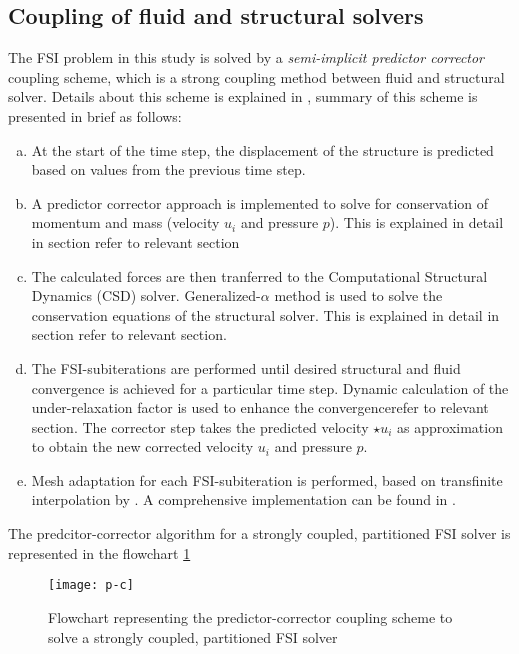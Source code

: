 \subsection{Coupling of fluid and structural solvers}

The FSI problem in this study is solved by a \textit{semi-implicit predictor corrector} coupling scheme, which is a strong coupling method between fluid and structural solver. Details about this scheme is explained in \citet{breuer2012fluid}, summary of this scheme is presented in brief as follows:
\begin{enumerate}[(a)]
 \item At the start of the time step, the displacement of the structure is predicted based on values from the previous time step.
 \item A predictor corrector approach is implemented to solve for conservation of momentum and mass (velocity $u_{i}$ and pressure $p$). This is explained in detail in section {refer to relevant section}
 \item The calculated forces are then tranferred to the Computational Structural Dynamics (CSD) solver. Generalized-$\alpha$ method is used to solve the conservation equations of the structural solver. This is explained in detail in section {refer to relevant section}.
 \item The FSI-subiterations are performed until desired structural and fluid convergence is achieved for a particular time step. Dynamic calculation of the under-relaxation factor is used to enhance the convergence{refer to relevant section}. The corrector step takes the predicted velocity $\star{u}_{i}$ as approximation to obtain the new corrected velocity $u_{i}$ and pressure $p$. 
 \item Mesh adaptation for each FSI-subiteration is performed, based on transfinite interpolation by \citet{thompson1985numerical}. A comprehensive implementation can be found in \citet{munsch2011numerical}. 
\end{enumerate}
\par
The predcitor-corrector algorithm for a strongly coupled, partitioned FSI solver is represented in the flowchart \ref{fig:2.6}

\begin{figure}[h]
 \texttt{[image: p-c]}
 \caption{Flowchart representing the predictor-corrector coupling scheme to solve a strongly coupled, partitioned FSI solver \citet{munsch2011numerical}}
 \label{fig:2.6}
\end{figure}

